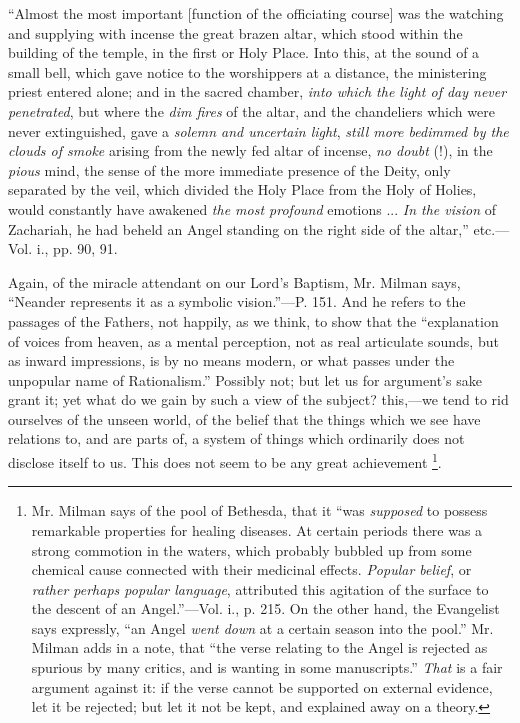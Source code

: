 ``Almost
the most important [function of the officiating course] was the
watching and supplying with incense the great brazen altar, which
stood within the building of the temple, in the first or Holy Place.
Into this, at the sound of a small bell, which gave notice to the
worshippers at a distance, the ministering priest entered alone; and
in the sacred chamber, \emph{into which the light of day never penetrated},
but where the \emph{dim fires} of the altar, and the chandeliers which
were never extinguished, gave a \emph{solemn and uncertain light}, \emph{still
more bedimmed by the clouds of smoke} arising from the newly fed
altar of incense, \emph{no doubt} (!), in the \emph{pious} mind, the
sense of the more immediate presence of the Deity, only separated by
the veil, which divided the Holy Place from the Holy of Holies, would
constantly have awakened \emph{the most profound} emotions ... \emph{In
the vision} of Zachariah, he had beheld an Angel standing on the
right side of the altar,'' etc.—Vol. i., pp. 90, 91.

Again, of the miracle attendant on our Lord's
Baptism, Mr. Milman says, ``Neander represents it as a symbolic vision.''—P.
151. And he refers to the passages of the Fathers, not happily, as we
think, to show that the ``explanation of voices from heaven, as a
mental perception, not as real articulate sounds, but as inward
impressions, is by no means modern, or what passes under the unpopular
name of Rationalism.'' Possibly not; but let us for argument's sake
grant it; yet what do we gain by such a view of the subject?
this,—we tend to rid ourselves of the unseen world, of the belief
that the things which we see have relations to, and are parts of, a
system of things which ordinarily does not disclose itself to us. This
does not seem to be any great achievement \footnote{Mr. Milman says of the pool of Bethesda, that it ``was
\emph{supposed} to possess remarkable properties for healing diseases. At
certain periods there was a strong commotion in the waters, which
probably bubbled up from some chemical cause connected with their
medicinal effects. \emph{Popular belief}, or \emph{rather perhaps popular
language}, attributed this agitation of the surface to the descent
of an Angel.''—Vol. i., p. 215. On the other hand, the Evangelist
says expressly, ``an Angel \emph{went down} at a certain season into
the pool.'' Mr. Milman adds in a note, that ``the verse relating to the
Angel is rejected as spurious by many critics, and is wanting in some
manuscripts.'' \emph{That} is a fair argument against it: if the verse
cannot be supported on external evidence, let it be rejected; but let
it not be kept, and explained away on a theory.}.

